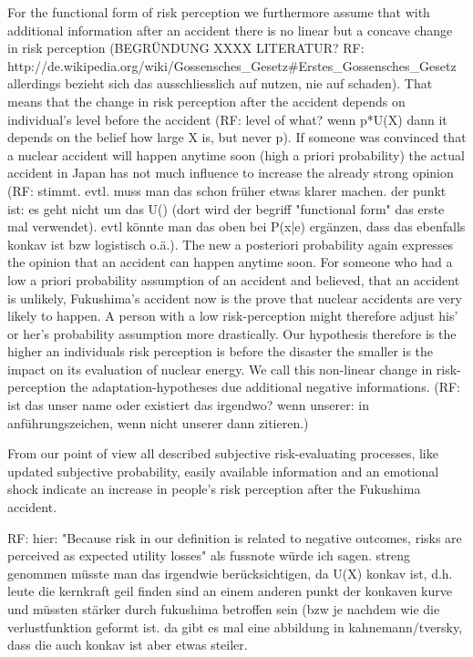 For the functional form of risk perception we furthermore assume that with additional information after an accident there is no linear but a concave change in risk perception (BEGRÜNDUNG XXXX LITERATUR? RF: http://de.wikipedia.org/wiki/Gossensches_Gesetz#Erstes_Gossensches_Gesetz allerdings bezieht sich das ausschliesslich auf nutzen, nie auf schaden).  That means that the change in risk perception after the accident depends on individual's level before the accident (RF: level of what? wenn p*U(X) dann it depends on the belief how large X is, but never p). If someone was convinced that a nuclear accident will happen anytime soon (high a priori probability) the actual accident in Japan has not much influence to increase the already strong opinion (RF: stimmt. evtl. muss man das schon früher etwas klarer machen. der punkt ist: es geht nicht um das U() (dort wird der begriff "functional form" das erste mal verwendet). evtl könnte man das oben bei P(x|e) ergänzen, dass das ebenfalls konkav ist bzw logistisch o.ä.). The new a posteriori probability again expresses the opinion that an accident can happen anytime soon. For someone who had a low a priori probability assumption of an accident and believed, that an accident is unlikely, Fukushima's accident now is the prove that nuclear accidents are very likely to happen. A person with a low risk-perception might therefore adjust his' or her's probability assumption more drastically. Our hypothesis therefore is the higher an individuals risk perception is before the disaster the smaller is the impact on its evaluation of nuclear energy.
We call this non-linear change in risk-perception the adaptation-hypotheses due additional negative informations. (RF: ist das unser name oder existiert das irgendwo? wenn unserer: in anführungszeichen, wenn nicht unserer dann zitieren.)

From our point of view all described subjective risk-evaluating processes, like updated subjective probability, easily available information and an emotional shock indicate an increase in people's risk perception after the Fukushima accident. 


RF: hier: "Because risk in our definition is related to negative outcomes, risks are perceived as expected utility losses" als fussnote würde ich sagen. streng genommen müsste man das irgendwie berücksichtigen, da U(X) konkav ist, d.h. leute die kernkraft geil finden sind an einem anderen punkt der konkaven kurve und müssten stärker durch fukushima betroffen sein (bzw je nachdem wie die verlustfunktion geformt ist. da gibt es mal eine abbildung in kahnemann/tversky, dass die auch konkav ist aber etwas steiler.

